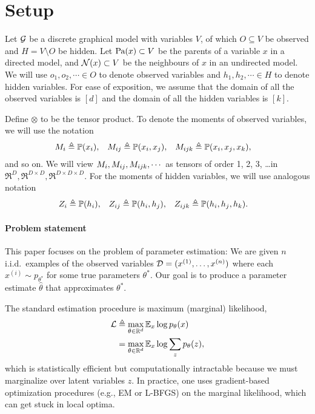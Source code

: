 \section{Setup}
\label{sec:setup}

Let $\mathcal{G}$ be a discrete graphical model with variables $V$, of which
  $O \subseteq V$ be observed and $H = V \setminus O$ be hidden.
Let $\textrm{Pa}(x) \subset V$ be the parents of a variable $x$ in a directed
  model, and $\mathcal{N}(x) \subset V$ be the neighbours of $x$ in an undirected
  model.
We will use $o_1, o_2, \cdots \in O$ to denote observed variables and
  $h_1, h_2, \cdots \in H$ to denote hidden variables.
For ease of exposition, we assume that the domain of all the observed
  variables is $[d]$ and the domain of all the hidden variables is
  $[k]$.

Define $\otimes$ to be the tensor product.
To denote the moments of observed variables, we will use the notation
\begin{align*}
  M_i &\triangleq \mathbb{P}(x_i), &
  M_{ij} &\triangleq \mathbb{P}(x_i, x_j), &
  M_{ijk} &\triangleq \mathbb{P}(x_i, x_j, x_k),
\end{align*}
and so on.
We will view $M_i, M_{ij}, M_{ijk}, \cdots$ as tensors of
  order 1, 2, 3, \ldots in $\Re^D, \Re^{D\times D}, \Re^{D \times
  D \times D}$.
For the moments of hidden variables, we will use analogous notation
\begin{align*}
  Z_i &\triangleq \mathbb{P}(h_i), &
  Z_{ij} &\triangleq \mathbb{P}(h_i, h_j), &
  Z_{ijk} &\triangleq \mathbb{P}(h_i, h_j, h_k).
\end{align*}

\paragraph{Problem statement}

This paper focuses on the problem of parameter estimation:
We are given $n$ i.i.d.~examples of the observed variables $\mathcal{D} = (x^{(1)}, \dots, x^{(n)})$
where each $x^{(i)} \sim p_{\theta^*}$ for some true parameters $\theta^*$.
Our goal is to produce a parameter estimate $\hat\theta$ that approximates $\theta^*$.

The standard estimation procedure is maximum (marginal) likelihood,
  \begin{align*}
    \mathcal{L} &\triangleq \max_{\theta \in \mathbb{R}^d} \mathbb{E}_{x} \log p_\theta(x) \\
        &=      \max_{\theta \in \mathbb{R}^d} \mathbb{E}_{x} \log \sum_z p_\theta(z),
  \end{align*}
  which is statistically efficient but computationally intractable
  because we must marginalize over latent variables $z$.
In practice, one uses gradient-based optimization procedures (e.g., EM
  or L-BFGS) on the marginal likelihood, which can get stuck in local
  optima.


